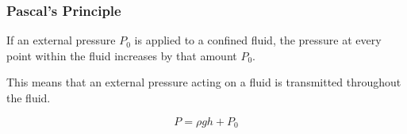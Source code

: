 \documentclass[]{beamer}
\begin{document}




























\begin{frame}
\frametitle{Pascal's Principle}


If an external pressure $P_0$ is applied to a confined fluid, the pressure at every point 
within the fluid increases by that amount $P_0$.
\vspace{3mm}

 This means that an external pressure acting on a fluid is transmitted throughout the fluid.

\begin{equation}
P=\rho g h+P_0 
\end{equation}


  \end{frame}
\end{document}
